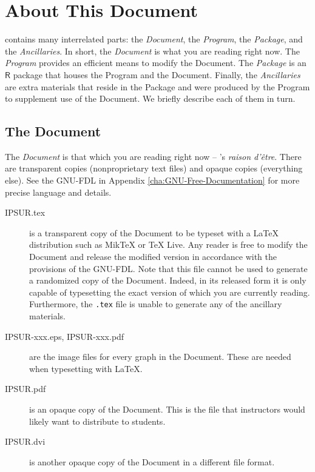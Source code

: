 \documentclass[captions=tableheading]{scrbook}
\begin{document}
\section*{About This Document}

\IPSUR contains many interrelated parts: the \emph{Document}, the \emph{Program}, the \emph{Package}, and the \emph{Ancillaries}. In short, the \emph{Document} is what you are reading right now. The \emph{Program} provides an efficient means to modify the Document. The \emph{Package} is an \(\mathsf{R}\) package that houses the Program and the Document. Finally, the \emph{Ancillaries} are extra materials that reside in the Package and were produced by the Program to supplement use of the Document. We briefly describe each of them in turn.

\subsection*{The Document}

The \emph{Document} is that which you are reading right now -- \IPSUR's \emph{raison d'\^etre}. There are transparent copies (nonproprietary text files) and opaque copies (everything else). See the GNU-FDL in Appendix \ref{cha:GNU-Free-Documentation} for more precise language and details.


\begin{description}
\item[IPSUR.tex] is a transparent copy of the Document to be typeset with a \LaTeX{} distribution such as Mik\TeX{} or \TeX{} Live. Any reader is free to modify the Document and release the modified version in accordance with the provisions of the GNU-FDL. Note that this file cannot be used to generate a randomized copy of the Document. Indeed, in its released form it is only capable of typesetting the exact version of \IPSUR which you are currently reading. Furthermore, the \texttt{.tex} file is unable to generate any of the ancillary materials.
\item[IPSUR-xxx.eps, IPSUR-xxx.pdf] are the image files for every graph in the Document. These are needed when typesetting with \LaTeX{}.
\item[IPSUR.pdf] is an opaque copy of the Document. This is the file that instructors would likely want to distribute to students.
\item[IPSUR.dvi] is another opaque copy of the Document in a different file format.
\end{description}
\end{document}
